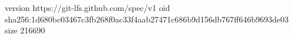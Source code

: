 version https://git-lfs.github.com/spec/v1
oid sha256:1d680bc03467c3fb268f0ac33f4aab27471c686b9d156db767ff646b9693de03
size 216690

